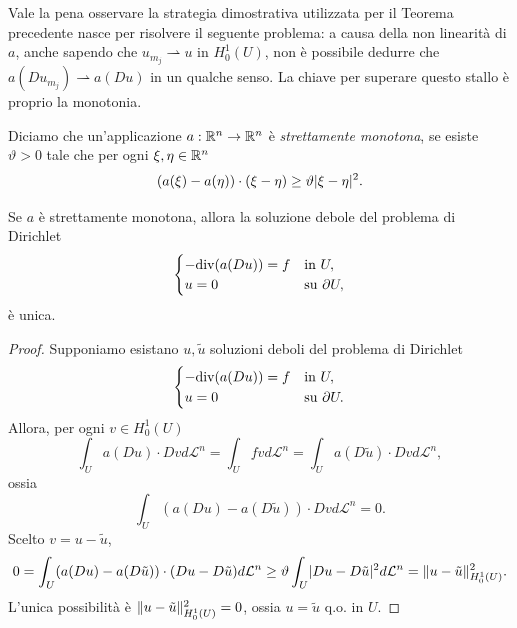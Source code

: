 \begin{osservazione}
	Vale la pena osservare la strategia dimostrativa utilizzata per il Teorema precedente nasce per risolvere il seguente problema: a causa della non linearità di $a$, anche sapendo che $u_{m_j} \rightharpoonup u$ in $H^1_0(U)$, non è possibile dedurre che $a(Du_{m_j}) \rightharpoonup a(Du)$ in un qualche senso. La chiave per superare questo stallo è proprio la monotonia.
\end{osservazione}
\begin{definizione}
	Diciamo che un'applicazione $a: \R^n \to \R^n$ è \emph{strettamente monotona}, se esiste $\vartheta >0$ tale che per ogni $\xi,\eta \in \R^n$
	\[ (a(\xi) - a(\eta))\cdot (\xi - \eta) \ge \vartheta \abs{\xi -\eta}^2. \]
\end{definizione}
\begin{teorema}
	Se $a$ è strettamente monotona, allora la soluzione debole del problema di Dirichlet
	\[ 	\begin{cases}
		-\div(a(Du)) = f & \textup{in } U,\\
		u = 0 & \textup{su } \partial U,
	\end{cases} \]
	è unica.
\end{teorema}
\begin{proof}
	Supponiamo esistano $u,\tilde{u}$ soluzioni deboli del problema di Dirichlet
	\[ 	\begin{cases}
		-\div(a(Du)) = f & \textup{in } U,\\
		u = 0 & \textup{su } \partial U.
	\end{cases} \]
	Allora, per ogni $v \in H^1_0(U)$
	\[ \int_U a(Du)\cdot Dv d\mathcal{L}^n = \int_U fv d\mathcal{L}^n = \int_U a(D\tilde{u})\cdot Dv d\mathcal{L}^n, \]
	ossia 
	\[ \int_U(a(Du)-a(D\tilde{u}))\cdot Dv d\mathcal{L}^n = 0. \]
	Scelto $v = u - \tilde{u}$,
	\[ 0 = \int_U(a(Du)-a(D\tilde{u}))\cdot (Du - D\tilde{u})d\mathcal{L}^n \ge \vartheta \int_U \abs{Du- D\tilde{u}}^2 d\mathcal{L}^n = \norm{u-\tilde{u}}_{H^1_0(U)}^2.\]
	L'unica possibilità è $\norm{u-\tilde{u}}_{H^1_0(U)}^2 = 0$, ossia $u = \tilde{u}$ q.o. in $U$.
\end{proof}

